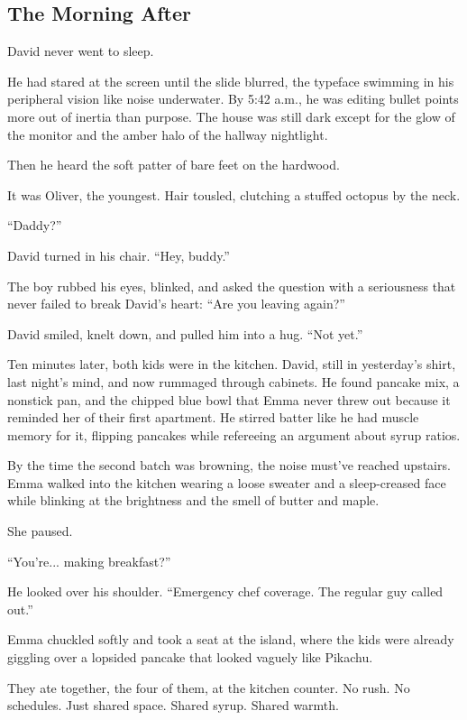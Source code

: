 \subsection{The Morning After}

David never went to sleep.

He had stared at the screen until the slide blurred, the typeface swimming in his peripheral vision 
like noise underwater. By 5:42 a.m., he was editing bullet points more out of inertia than purpose. 
The house was still dark except for the glow of the monitor and the amber halo of the hallway nightlight.

Then he heard the soft patter of bare feet on the hardwood.

It was Oliver, the youngest. Hair tousled, clutching a stuffed octopus by the neck.

``Daddy?''

David turned in his chair. ``Hey, buddy.''

The boy rubbed his eyes, blinked, and asked the question with a seriousness that never failed to break 
David’s heart: ``Are you leaving again?''

David smiled, knelt down, and pulled him into a hug. ``Not yet.''

Ten minutes later, both kids were in the kitchen. David, still in yesterday’s shirt, last night’s mind, and now 
rummaged through cabinets. He found pancake mix, a nonstick pan, and the chipped blue bowl that Emma never 
threw out because it reminded her of their first apartment. He stirred batter like he had muscle memory 
for it, flipping pancakes while refereeing an argument about syrup ratios.

By the time the second batch was browning, the noise must’ve reached upstairs. Emma walked into the kitchen 
wearing a loose sweater and a sleep-creased face while blinking at the brightness and the smell of butter and maple.

She paused.

``You’re... making breakfast?''

He looked over his shoulder. ``Emergency chef coverage. The regular guy called out.''

Emma chuckled softly and took a seat at the island, where the kids were already giggling over a lopsided 
pancake that looked vaguely like Pikachu.

They ate together, the four of them, at the kitchen counter. No rush. No schedules. Just shared space. Shared 
syrup. Shared warmth.

